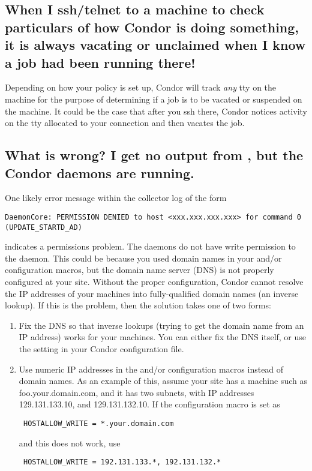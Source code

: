 \subsection{When I ssh/telnet to a machine to check particulars of how
Condor is doing something, it is always vacating or unclaimed when I
know a job had been running there!}

Depending on how your policy is set up, Condor will track \emph{any} tty
on the machine for the purpose of determining if a job is to be vacated
or suspended on the machine. It could be the case that after you ssh
there, Condor notices activity on the tty allocated to your connection
and then vacates the job.


\subsection{What is wrong? I get no output from , but
the Condor daemons are running.} 
One likely error message within the collector log of the form
\begin{verbatim}
DaemonCore: PERMISSION DENIED to host <xxx.xxx.xxx.xxx> for command 0 (UPDATE_STARTD_AD)
\end{verbatim}
indicates a permissions problem.
The  daemons do not have write permission to the
 daemon.
This could be because
you used domain names in your  and/or
 configuration macros,
but the domain name server (DNS) is not properly configured at your site.
Without the proper configuration, Condor cannot resolve
the IP addresses of your machines
into fully-qualified domain names (an inverse lookup).
If this is the problem, then the solution takes one of two forms:
\begin{enumerate}
\item Fix the DNS so that inverse lookups (trying to get the domain name
   from an IP address) works for your machines.  You can
   either fix the DNS itself,
   or use the  setting in your Condor
         configuration file.
\item Use numeric IP addresses in the  and/or
    configuration macros
   instead of domain names.
   As an example of this, assume your site has a machine such as
   foo.your.domain.com, and it has two subnets, with IP addresses
   129.131.133.10, and 129.131.132.10.
   If the configuration macro is set as 

\begin{verbatim}
 HOSTALLOW_WRITE = *.your.domain.com
\end{verbatim}

   and this does not work, use

\begin{verbatim}
 HOSTALLOW_WRITE = 192.131.133.*, 192.131.132.*
\end{verbatim}
\end{enumerate}

